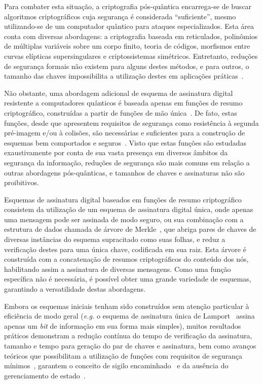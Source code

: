 \documentclass{ufsctex/ufsctex}
\begin{document}
Para combater esta situação, a criptografia pós-quântica encarrega-se de buscar
algoritmos criptográficos cuja segurança é considerada ``suficiente'', mesmo
utilizando-se de um computador quântico para ataques especializados. Esta área
conta com diversas abordagens: a criptografia baseada em reticulados,
polinômios de múltiplas variáveis sobre um corpo finito, teoria de códigos,
morfismos entre curvas elípticas supersingulares e criptossistemas simétricos.
Entretanto, reduções de segurança formais não existem para alguns destes
métodos, e para outros, o tamanho das chaves impossibilita a utilização destes
em aplicações práticas~\cite{Bernstein2017}.

Não obstante, uma abordagem adicional de esquema de assinatura digital
resistente a computadores quânticos é baseada apenas em funções de resumo
criptográfico, construídas a partir de funções de mão
única~\cite{cryptoeprint:2005:328}. De fato, estas funções, desde que
apresentem requisitos de segurança como resistência à segunda pré-imagem e/ou à
colisões, são necessárias e suficientes para a construção de esquemas bem
comportados e seguros~\cite{Rompel:1990:OFN:100216.100269}. Visto que estas
funções são estudadas exaustivamente por conta de sua vasta presença em
diversos âmbitos da segurança da informação, reduções de segurança são mais
comuns em relação a outras abordagens pós-quânticas, e tamanhos de chaves e
assinaturas não são proibitivos.

Esquemas de assinatura digital baseados em funções de resumo criptográfico
consistem da utilização de um esquema de assinatura digital única, onde apenas
uma mensagem pode ser assinada de modo seguro, ou sua combinação com a
estrutura de dados chamada de árvore de
Merkle~\cite{Merkle:1989:CDS:118209.118230}, que abriga pares de chaves de
diversas instâncias do esquema supracitado como suas folhas, e reduz a
verificação destes para uma única chave, codificada em sua raiz. Esta árvore é
construída com a concatenação de resumos criptográficos do conteúdo dos nós,
habilitando assim a assinatura de diversas mensagens. Como uma função
específica não é necessária, é possível obter uma grande variedade de esquemas,
garantindo a versatilidade destas abordagens.

Embora os esquemas iniciais tenham sido construídos sem atenção particular à
eficiência de modo geral (\emph{e.g.} o esquema de assinatura única de
Lamport~\cite{lamport1979constructing} assina apenas um \emph{bit} de
informação em sua forma mais simples), muitos resultados práticos demonstram a
redução contínua do tempo de verificação da assinatura, tamanho e tempo para
geração do par de chaves e assinatura, bem como avanços teóricos que
possibilitam a utilização de funções com requisitos de segurança
mínimos~\cite{Hlsing2013}, garantem o conceito de sigilo
encaminhado~\cite{Buchmann:2011:XPF:2184003.2184011} e da ausência do
gerenciamento de estado~\cite{Bernstein2015}.
\end{document}
